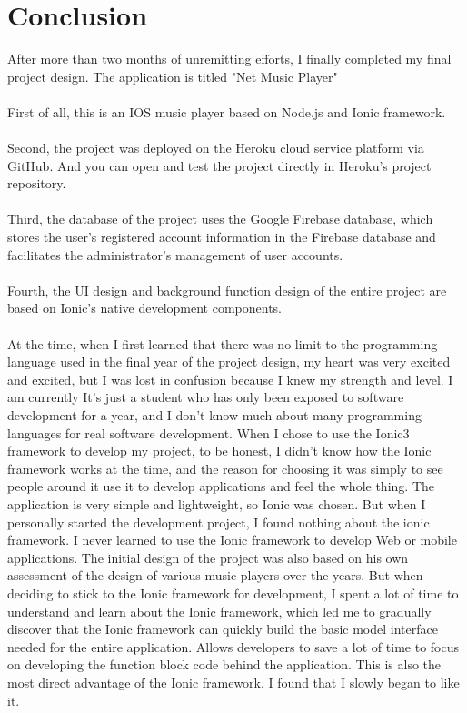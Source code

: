 \chapter{Conclusion}
After more than two months of unremitting efforts, I finally completed my final project design. The application is titled "Net Music Player" 
\\ \\ 
First of all, this is an IOS music player based on Node.js and Ionic framework.
\\ \\ 
Second, the project was deployed on the Heroku cloud service platform via GitHub. And you can open and test the project directly in Heroku's project repository.
\\ \\ 
Third, the database of the project uses the Google Firebase database, which stores the user's registered account information in the Firebase database and facilitates the administrator's management of user accounts.
\\ \\ 
Fourth, the UI design and background function design of the entire project are based on Ionic's native development components. 
\\ \\ 
At the time, when I first learned that there was no limit to the programming language used in the final year of the project design, my heart was very excited and excited, but I was lost in confusion because I knew my strength and level. I am currently It's just a student who has only been exposed to software development for a year, and I don't know much about many programming languages ​​for real software development. When I chose to use the Ionic3 framework to develop my project, to be honest, I didn't know how the Ionic framework works at the time, and the reason for choosing it was simply to see people around it use it to develop applications and feel the whole thing. The application is very simple and lightweight, so Ionic was chosen. But when I personally started the development project, I found nothing about the ionic framework. I never learned to use the Ionic framework to develop Web or mobile applications. The initial design of the project was also based on his own assessment of the design of various music players over the years. But when deciding to stick to the Ionic framework for development, I spent a lot of time to understand and learn about the Ionic framework, which led me to gradually discover that the Ionic framework can quickly build the basic model interface needed for the entire application. Allows developers to save a lot of time to focus on developing the function block code behind the application. This is also the most direct advantage of the Ionic framework. I found that I slowly began to like it. \\ \\
